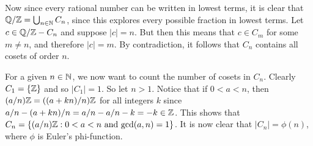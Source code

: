 \documentclass{article}
\begin{document}
Now since every rational number can be written in lowest terms,
it is clear that $\mathbb{Q}/\mathbb{Z}=\bigcup_{n\in\mathbb{N}}C_n$, since this explores
every possible fraction in lowest terms.
Let $c\in\mathbb{Q}/\mathbb{Z}-C_n$ and suppose $|c|=n$.
But then this means that $c\in C_m$ for some $m\neq n$,
and therefore $|c|=m$.  By contradiction,
it follows that $C_n$ contains all cosets of order $n$.

For a given $n\in\mathbb{N}$, we now want to count the number of cosets
in $C_n$.  Clearly $C_1=\{\mathbb{Z}\}$ and so $|C_1|=1$.  So let $n>1$.
Notice that if $0<a<n$, then
$(a/n)\mathbb{Z}=((a+kn)/n)\mathbb{Z}$ for all integers $k$ since
$a/n-(a+kn)/n=a/n-a/n-k=-k\in\mathbb{Z}$.
This shows that
$C_n=\{(a/n)\mathbb{Z}:\mbox{$0<a<n$ and $\gcd(a,n)=1$}\}$.
It is now clear that $|C_n|=\phi(n)$, where $\phi$ is
Euler's phi-function.
\end{document}
